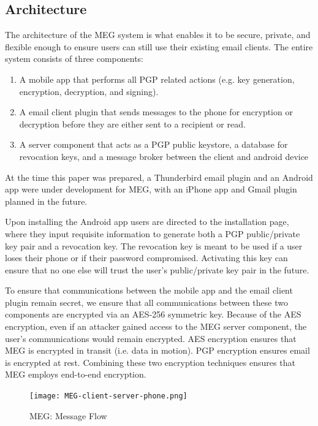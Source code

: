 \documentclass[10pt]{article}
\begin{document}
\begin{multicols}{2}
\section{Architecture}
\par The architecture of the MEG system is what enables it to be secure, private, and flexible enough to ensure users can still use their existing email clients. The entire system consists of three components:
\begin{enumerate}
    \item A mobile app that performs all PGP related actions (e.g. key generation, encryption, decryption, and signing).
    \item A email client plugin that sends messages to the phone for encryption or decryption before they are either sent to a recipient or read.
    \item A server component that acts as a PGP public keystore, a database for revocation keys, and a message broker between the client and android device
\end{enumerate}
At the time this paper was prepared, a Thunderbird email plugin and an Android app were under development for MEG, with an iPhone app and Gmail plugin planned in the future.
\par Upon installing the Android app users are directed to the installation page, where they input requisite information to generate both a PGP public/private key pair and a revocation key. The revocation key is meant to be used if a user loses their phone or if their password compromised. Activating this key can ensure that no one else will trust the user's public/private key pair in the future.
\par To ensure that communications between the mobile app and the email client plugin remain secret, we ensure that all communications between these two components are encrypted via an AES-256 symmetric key. Because of the AES encryption, even if an attacker gained access to the MEG server component, the user's communications would remain encrypted. AES encryption ensures that MEG is encrypted in transit (i.e. data in motion). PGP encryption ensures email is encrypted at rest. Combining these two encryption techniques ensures that MEG employs end-to-end encryption.
\end{multicols}
\begin{figure}[h]
    \texttt{[image: MEG-client-server-phone.png]}
    \caption{MEG: Message Flow}
    \label{fig:Flow}
\end{figure}
\end{document}
